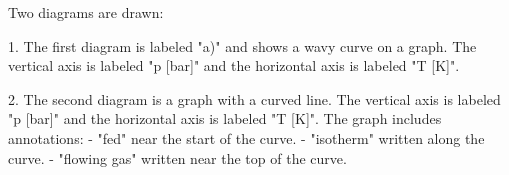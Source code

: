 Two diagrams are drawn:  

1. The first diagram is labeled "a)" and shows a wavy curve on a graph. The vertical axis is labeled "p [bar]" and the horizontal axis is labeled "T [K]".  

2. The second diagram is a graph with a curved line. The vertical axis is labeled "p [bar]" and the horizontal axis is labeled "T [K]". The graph includes annotations:  
   - "fed" near the start of the curve.  
   - "isotherm" written along the curve.  
   - "flowing gas" written near the top of the curve.